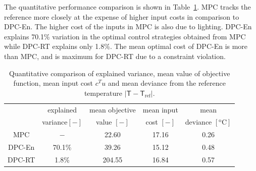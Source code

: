 The quantitative performance comparison is shown in Table~\ref{T:comparison}. MPC tracks the reference more closely at the expense of higher input costs in comparison to DPC-En. The higher cost of the inputs in MPC is also due to lighting. DPC-En explains 70.1\% variation in the optimal control strategies obtained from MPC while DPC-RT explains only 1.8\%. The mean optimal cost of DPC-En is more than MPC, and is maximum for DPC-RT due to a constraint violation.

\begin{table}[h!]
	\centering
	\begin{tabular}{ccccc}
		\toprule
		& explained & mean objective& mean input  & mean  \\
		&  variance$[\mathrm{-}]$ & value $[\mathrm{-}]$ & cost $[-]$ & deviance $[\mathrm{^oC}]$ \\     
		\midrule
		MPC    &  $\mathrm{-}$ &  22.60 & 17.16  &  0.26  \\
		DPC-En   & 70.1\% &  39.26  & 15.12 &  0.48 \\
		DPC-RT  & 1.8\% & 204.55 & 16.84 &  0.57 \\
		\bottomrule
	\end{tabular}
	\vspace{0.2cm}
	\caption{Quantitative comparison of explained variance, mean value of objective function, mean input cost $c^Tu$ and mean deviance from the reference temperature $|\mathsf{T}-\mathsf{T}_{\mathrm{ref}}|$.}
	\captionsetup{justification=centering}
	\label{T:comparison}
\end{table}

